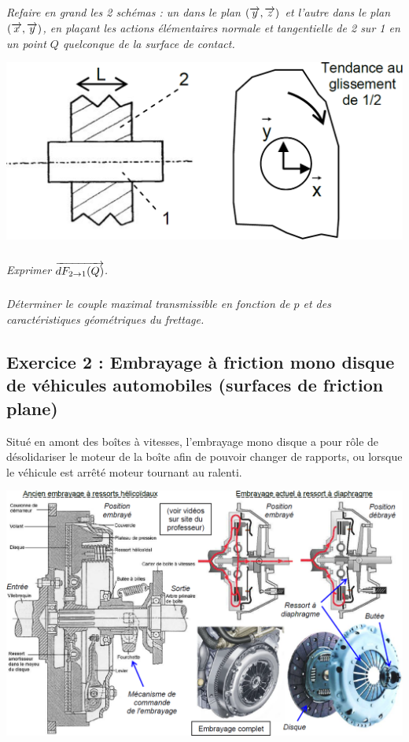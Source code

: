 \documentclass[10pt,fleqn]{article} %
\begin{document}
\begin{multicols}{2}
\subparagraph{}
\textit{Refaire en grand les 2 schémas  : un 
dans le plan $(\overrightarrow{y}, \overrightarrow{z})$ et l’autre dans le plan $(\overrightarrow{x}, \overrightarrow{y})$, 
en plaçant les actions élémentaires normale et 
tangentielle de 2 sur 1 en un point $Q$ 
quelconque de la surface de contact. }


\begin{center}
\includegraphics[width=.8\linewidth]{images/fig_05}
\end{center}



\subparagraph{}
\textit{Exprimer $\overrightarrow{dF_{2\rightarrow 1}(Q)}$.}

\subparagraph{}
\textit{Déterminer le couple maximal transmissible en fonction de $p$ et des 
caractéristiques géométriques du frettage.}


\subsection*{Exercice 2 : Embrayage à friction mono disque de véhicules automobiles (surfaces de friction plane)}
\setcounter{exo}{0} 
Situé en amont des boîtes à vitesses, l'embrayage mono disque a pour rôle de désolidariser le moteur de la 
boîte afin de pouvoir changer de rapports, ou lorsque le véhicule est arrêté moteur tournant au ralenti. 

\begin{center}
\includegraphics[width=\linewidth]{images/fig_06}
\end{center}


\end{multicols}
\end{document}
